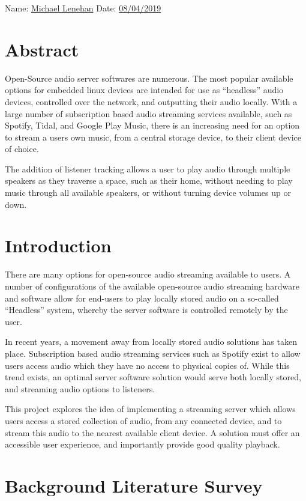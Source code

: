 \documentclass[11pt,a4paper]{scrreprt}
\begin{document}
Name: \underline{Michael Lenehan} Date: \underline{08/04/2019}

\chapter{Abstract}\label{abstract}

Open-Source audio server softwares are numerous. The most popular
available options for embedded linux devices are intended for use as
``headless'' audio devices, controlled over the network, and outputting
their audio locally. With a large number of subscription based audio
streaming services available, such as Spotify, Tidal, and Google Play
Music, there is an increasing need for an option to stream a users own
music, from a central storage device, to their client device of choice.

The addition of listener tracking allows a user to play audio through
multiple speakers as they traverse a space, such as their home, without
needing to play music through all available speakers, or without turning
device volumes up or down.

\chapter{Introduction}\label{introduction}

There are many options for open-source audio streaming available to
users. A number of configurations of the available open-source audio
streaming hardware and software allow for end-users to play locally
stored audio on a so-called ``Headless'' system, whereby the server
software is controlled remotely by the user.

In recent years, a movement away from locally stored audio solutions has
taken place. Subscription based audio streaming services such as Spotify
exist to allow users access audio which they have no access to physical
copies of. While this trend exists, an optimal server software solution
would serve both locally stored, and streaming audio options to
listeners.

This project explores the idea of implementing a streaming server which
allows users access a stored collection of audio, from any connected
device, and to stream this audio to the nearest available client device.
A solution must offer an accessible user experience, and importantly
provide good quality playback.

\chapter{Background Literature
Survey}\label{background-literature-survey}
\end{document}
